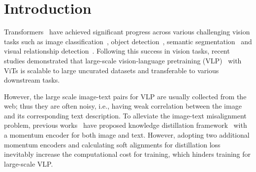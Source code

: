 \section{Introduction}
\label{sec:introduction}

Transformers~\cite{vaswani2017attention} have achieved significant progress across various challenging vision tasks such as image classification~\cite{dosovitskiy2021an,touvron2021training,jiang2021all,graham2021levit}, object detection~\cite{carion2020end}, semantic segmentation~\cite{xie2021segformer,liu2021swin,wang2021pyramid} and visual relationship detection~\cite{kim2021hotr,kim2022mstr}.
Following this success in vision tasks, recent studies demonstrated that large-scale vision-language pretraining (VLP)~\cite{li2019visualbert,chen2019uniter,huang2019unicoder,li2020oscar,li2020unimo,lu2019vilbert,tan2019lxmert,jia2021scaling,radford2021learning} with ViTs is scalable to large uncurated datasets and transferable to various downstream tasks.

However, the large scale image-text pairs for VLP are usually collected from the web; thus they are often noisy, i.e., having weak correlation between the image and its corresponding text description.
To alleviate the image-text misalignment problem, previous works~\cite{li2021align,Lu2022COTS} have proposed knowledge distillation framework~\cite{hinton2015distilling} with a momentum encoder for both image and text.
However, adopting two additional momentum encoders and calculating soft alignments for distillation loss inevitably increase the computational cost for training, which hinders training for large-scale VLP.

